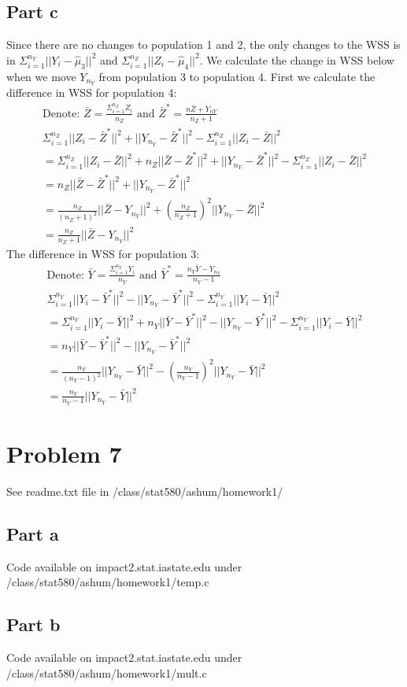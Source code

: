\documentclass{article}\usepackage[]{graphicx}\usepackage[]{color}
\begin{document}
\subsection*{Part c}
Since there are no changes to population 1 and 2, the only changes to the WSS is in $\Sigma_{i=1}^{n_Y}||Y_i - \hat{\mu}_3||^2$ and $\Sigma_{i=1}^{n_Z}||Z_i - \hat{\mu}_4||^2$.  We calculate the change in WSS below when we move $Y_{n_Y}$ from population 3 to population 4.  First we calculate the difference in WSS for population 4:
\begin{align*}
\text{Denote: } \bar{Z} = \frac{\Sigma_{i=1}^{n_Z}Z_i}{n_Z} \text{ and } \bar{Z}^* = \frac{n\bar{Z} + Y_{nY}}{n_Z + 1} \\ 
\Sigma_{i=1}^{n_Z}||Z_i - \bar{Z}^*||^2 + ||Y_{n_Y} - \bar{Z}^*||^2 - \Sigma_{i=1}^{n_Z}||Z_i - \bar{Z}||^2\\
= \Sigma_{i=1}^{n_Z}||Z_i - \bar{Z}||^2 + n_{Z}||\bar{Z} - \bar{Z}^*||^2 + ||Y_{n_Y} - \bar{Z}^*||^2 - \Sigma_{i=1}^{n_Z}||Z_i - \bar{Z}||^2\\
= n_{Z}||\bar{Z} - \bar{Z}^*||^2 + ||Y_{n_Y} - \bar{Z}^*||^2\\
= \frac{n_Z}{(n_Z + 1)^2}||\bar{Z} - Y_{n_Y}||^2 + (\frac{n_Z}{n_Z + 1})^2 ||Y_{n_Y} - \bar{Z}||^2\\
= \frac{n_Z}{n_Z + 1}||\bar{Z} - Y_{n_Y}||^2
\end{align*}
The difference in WSS for population 3:
\begin{align*}
\text{Denote: } \bar{Y} = \frac{\Sigma_{i=1}^{n_Y}Y_i}{n_Y} \text{ and }\bar{Y}^* = \frac{n_Y \bar{Y} - Y_{n_Y}}{n_Y - 1}\\
\Sigma_{i=1}^{n_Y}||Y_i - \bar{Y}^*||^2 - ||Y_{n_Y} - \bar{Y}^*||^2 - \Sigma_{i=1}^{n_Y}||Y_i - \bar{Y}||^2 \\
= \Sigma_{i=1}^{n_Y}||Y_i - \bar{Y}||^2 + n_Y||\bar{Y} - \bar{Y}^*||^2 - ||Y_{n_Y} - \bar{Y}^*||^2 - \Sigma_{i=1}^{n_Y}||Y_i - \bar{Y}||^2\\
= n_Y||\bar{Y} - \bar{Y}^*||^2 - ||Y_{n_Y} - \bar{Y}^*||^2 \\
= \frac{n_Y}{(n_Y - 1)^2}||Y_{n_Y} - \bar{Y}||^2 - (\frac{n_Y}{n_Y - 1})^2 ||Y_{n_Y} - \bar{Y}||^2 \\
= \frac{n_Y}{n_Y - 1}||Y_{n_Y} - \bar{Y}||^2
\end{align*}

\section*{Problem 7}
See readme.txt file in /class/stat580/ashum/homework1/
\subsection*{Part a}
Code available on impact2.stat.iastate.edu under /class/stat580/ashum/homework1/temp.c
\subsection*{Part b}
Code available on impact2.stat.iastate.edu under /class/stat580/ashum/homework1/mult.c
\end{document}
